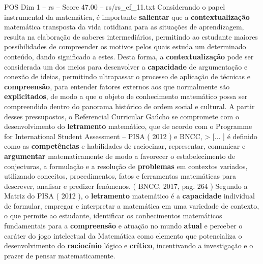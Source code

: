 \begin{textsample}{POS Dim 1 – rs – Score 47.00 – rs/rs\_ef\_11.txt}
Considerando o papel instrumental da matemática, é importante \textbf{salientar} que a \textbf{contextualização} matemática transposta da vida cotidiana para as situações de aprendizagem, resulta na elaboração de saberes intermediários, permitindo ao estudante maiores possibilidades de compreender os motivos pelos quais estuda um determinado conteúdo, dando significado a estes.
Desta forma, a \textbf{contextualização} pode ser considerada um dos meios para desenvolver a \textbf{capacidade} de argumentação e conexão de ideias, permitindo ultrapassar o processo de aplicação de técnicas e \textbf{compreensão}, para entender fatores externos aos que normalmente são \textbf{explicitados}, de modo a que o objeto de conhecimento matemático possa ser compreendido dentro do panorama histórico de ordem social e cultural.
A partir desses pressupostos, o Referencial Curricular Gaúcho se compromete com o desenvolvimento do \textbf{letramento} matemático, que de acordo com o Programme for International Student Assessment – PISA ( 2012 ) e BNCC, > [... ] é definido como as \textbf{competências} e habilidades de raciocinar, representar, comunicar e \textbf{argumentar} matematicamente de modo a favorecer o estabelecimento de conjecturas, a formulação e a resolução de \textbf{problemas} em contextos variados, utilizando conceitos, procedimentos, fatos e ferramentas matemáticas para descrever, analisar e predizer fenômenos. ( BNCC, 2017, pag. 264 ) Segundo a Matriz do PISA ( 2012 ), o \textbf{letramento} matemático é a \textbf{capacidade} individual de formular, empregar e interpretar a matemática em uma variedade de contexto, o que permite ao estudante, identificar os conhecimentos matemáticos fundamentais para a \textbf{compreensão} e atuação no mundo \textbf{atual} e perceber o caráter do jogo intelectual da Matemática como elemento que potencializa o desenvolvimento do \textbf{raciocínio} lógico e \textbf{crítico}, incentivando a investigação e o prazer de pensar matematicamente.

\end{textsample}

